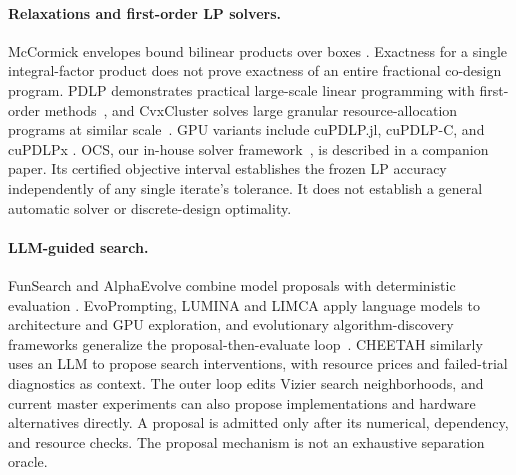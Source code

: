 \paragraph{Relaxations and first-order LP solvers.}
McCormick envelopes bound bilinear products over boxes \citep{mccormick1976computability}.
Exactness for a single integral-factor product does not prove exactness of an entire fractional co-design program.
PDLP demonstrates practical large-scale linear programming with first-order methods~\citep{applegate2022practicallargescalelinearprogramming,applegate2025pdlp}, and CvxCluster solves large granular resource-allocation programs at similar scale~\citep{cvxcluster2026}.
GPU variants include cuPDLP.jl, cuPDLP-C, and cuPDLPx \citep{lu2024cupdlpjlgpuimplementationrestarted,lu2024cupdlpcstrengthenedimplementationcupdlp,lu2025cupdlpxenhancedgpubasedfirstorder}.
OCS, our in-house solver framework~\citep{feng2026ocs}, is described in a companion paper.
Its certified objective interval establishes the frozen LP accuracy independently of any single iterate's tolerance.
It does not establish a general automatic solver or discrete-design optimality.

\paragraph{LLM-guided search.}
FunSearch and AlphaEvolve combine model proposals with deterministic evaluation \citep{romera2024mathematical,novikov2025alphaevolvecodingagentscientific}.
EvoPrompting, LUMINA and LIMCA apply language models to architecture and GPU exploration, and evolutionary algorithm-discovery frameworks generalize the proposal-then-evaluate loop~\citep{chen2023evopromptinglanguagemodelscodelevel,zhang2026luminallmguidedgpuarchitecture,vungarala2025limcallmautomatinganalog,surina2025algorithmdiscoveryllmsevolutionary,skydiscover2026}.
CHEETAH similarly uses an LLM to propose search interventions, with resource prices and failed-trial diagnostics as context.
The outer loop edits Vizier search neighborhoods, and current master experiments can also propose implementations and hardware alternatives directly.
A proposal is admitted only after its numerical, dependency, and resource checks.
The proposal mechanism is not an exhaustive separation oracle.

